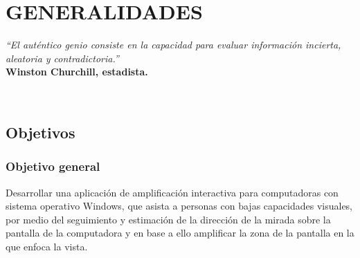 \documentclass[12pt]{book} %
\begin{document}
\setcounter{tocdepth}{3}   %
\tableofcontents %

\newpage %
\thispagestyle{empty} 
	
			 
\newpage		 
\pagestyle{fancy}


\chapter{GENERALIDADES}
\thispagestyle{empty}

\begin{minipage}{0.5\textwidth}
	\begin{flushleft} \large
	\scriptsize	\textsl{\large “El auténtico genio consiste en la capacidad para evaluar información incierta, 
								aleatoria y contradictoria.”}\\
	\scriptsize \textbf{Winston Churchill, estadista.}
	\end{flushleft}
\end{minipage}\\[4cm]			

\newpage
\section{Objetivos}
	\subsection{Objetivo general}
	
		Desarrollar una aplicación de amplificación interactiva para computadoras con sistema operativo Windows, 
		que asista a personas con bajas capacidades visuales, por medio del seguimiento y estimación de la dirección 
		de la mirada sobre la pantalla de la computadora y en base a ello amplificar la zona de la pantalla en la 
		que enfoca la vista.
	
\end{document}
